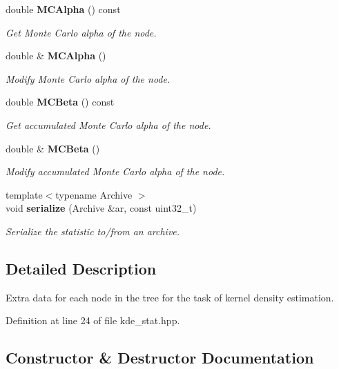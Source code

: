 \begin{DoxyCompactItemize}
double \textbf{ M\+C\+Alpha} () const
\begin{DoxyCompactList}\small\item\em Get Monte Carlo alpha of the node. \end{DoxyCompactList}\item 
double \& \textbf{ M\+C\+Alpha} ()
\begin{DoxyCompactList}\small\item\em Modify Monte Carlo alpha of the node. \end{DoxyCompactList}\item 
double \textbf{ M\+C\+Beta} () const
\begin{DoxyCompactList}\small\item\em Get accumulated Monte Carlo alpha of the node. \end{DoxyCompactList}\item 
double \& \textbf{ M\+C\+Beta} ()
\begin{DoxyCompactList}\small\item\em Modify accumulated Monte Carlo alpha of the node. \end{DoxyCompactList}\item 
{\footnotesize template$<$typename Archive $>$ }\\void \textbf{ serialize} (Archive \&ar, const uint32\+\_\+t)
\begin{DoxyCompactList}\small\item\em Serialize the statistic to/from an archive. \end{DoxyCompactList}\end{DoxyCompactItemize}


\subsection{Detailed Description}
Extra data for each node in the tree for the task of kernel density estimation. 

Definition at line 24 of file kde\+\_\+stat.\+hpp.



\subsection{Constructor \& Destructor Documentation}
\mbox{\label{classmlpack_1_1kde_1_1KDEStat_acffee2b814c792035ae39738acb47a91}} 
